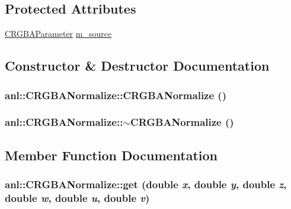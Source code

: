 \subsection*{Protected Attributes}
\begin{DoxyCompactItemize}
\item 
\hyperlink{classanl_1_1CRGBAParameter}{CRGBAParameter} \hyperlink{classanl_1_1CRGBANormalize_a3f4f9066210b59423433c1cf7e53c494}{m\_\-source}
\end{DoxyCompactItemize}


\subsection{Constructor \& Destructor Documentation}
\hypertarget{classanl_1_1CRGBANormalize_af4c3b40f005c0ec0e718cb3485da6cd3}{
\subsubsection[{CRGBANormalize}]{\setlength{\rightskip}{0pt plus 5cm}anl::CRGBANormalize::CRGBANormalize ()}}
\label{classanl_1_1CRGBANormalize_af4c3b40f005c0ec0e718cb3485da6cd3}
\hypertarget{classanl_1_1CRGBANormalize_acafae03851103b3b875708a015b533e0}{
\subsubsection[{$\sim$CRGBANormalize}]{\setlength{\rightskip}{0pt plus 5cm}anl::CRGBANormalize::$\sim$CRGBANormalize ()}}
\label{classanl_1_1CRGBANormalize_acafae03851103b3b875708a015b533e0}


\subsection{Member Function Documentation}
\hypertarget{classanl_1_1CRGBANormalize_a3cf10a459e0340cd687676580b42383d}{
\subsubsection[{get}]{ anl::CRGBANormalize::get (double {\em x}, \/  double {\em y}, \/  double {\em z}, \/  double {\em w}, \/  double {\em u}, \/  double {\em v})}}
\label{classanl_1_1CRGBANormalize_a3cf10a459e0340cd687676580b42383d}


